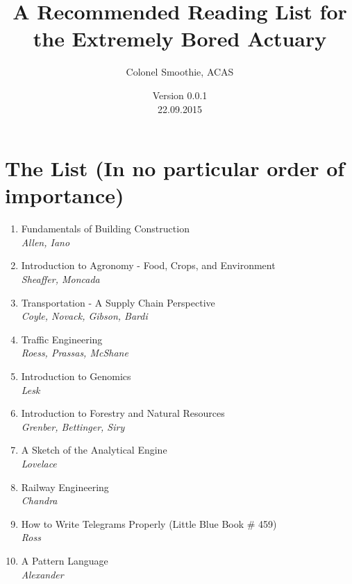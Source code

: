 \documentclass[oneside, titlepage]{article}
\begin{document}
\title{A Recommended Reading List for the Extremely Bored Actuary}
\author{Colonel Smoothie, ACAS}
\date{ Version 0.0.1\\ 22.09.2015}
\maketitle

\section*{The List (In no particular order of importance)}
\begin{enumerate}

\item{Fundamentals of Building Construction\\ \itshape Allen, Iano}

\item{Introduction to Agronomy - Food, Crops, and Environment\\ \itshape Sheaffer, Moncada}

\item{Transportation - A Supply Chain Perspective\\ \itshape Coyle, Novack, Gibson, Bardi}

\item{Traffic Engineering\\ \itshape Roess, Prassas, McShane}

\item{Introduction to Genomics\\ \itshape Lesk}

\item{Introduction to Forestry and Natural Resources\\ \itshape Grenber, Bettinger, Siry}

\item{A Sketch of the Analytical Engine\\ \itshape Lovelace}

\item{Railway Engineering\\ 	\itshape Chandra}

\item{How to Write Telegrams Properly (Little Blue Book \# 459)\\ \itshape Ross}

\item{A Pattern Language\\ \itshape Alexander}


\end{enumerate}
\end{document}
